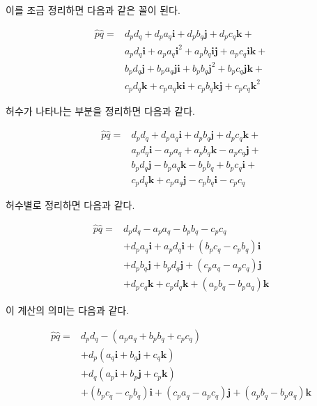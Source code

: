 이를 조금 정리하면 다음과 같은 꼴이 된다.

\begin{eqnarray}
\hat{p}\hat{q} = &
d_p d_q + d_p a_q{\mathbf i} + d_p b_q{\mathbf j} + d_p c_q{\mathbf k} + \\ \nonumber
& a_p d_q{\mathbf i}  + a_p a_q {\mathbf i}^2 + a_p b_q{\mathbf i} {\mathbf j} + a_p c_q {\mathbf i}  {\mathbf k} + \\ \nonumber
& b_p d_q {\mathbf j} + b_p a_q {\mathbf j} {\mathbf i} + b_p b_q{\mathbf j}^2 + b_p c_q {\mathbf j} {\mathbf k} + \\ \nonumber
& c_p d_q{\mathbf k}  + c_p a_q{\mathbf k} {\mathbf i} + c_p b_q{\mathbf k} {\mathbf j} + c_p c_q {\mathbf k}^2
\end{eqnarray}

허수가 나타나는 부분을 정리하면 다음과 같다.

\begin{eqnarray}
\hat{p}\hat{q} = &
d_p d_q + d_p a_q{\mathbf i} + d_p b_q{\mathbf j} + d_p c_q{\mathbf k} + \\ \nonumber
& a_p d_q{\mathbf i}  - a_p a_q + a_p b_q{\mathbf k} - a_p c_q {\mathbf j} + \\ \nonumber
& b_p d_q {\mathbf j} - b_p a_q {\mathbf k} - b_p b_q + b_p c_q {\mathbf i} + \\ \nonumber
& c_p d_q {\mathbf k}  + c_p a_q{\mathbf j} - c_p b_q{\mathbf i} - c_p c_q 
\end{eqnarray}

허수별로 정리하면 다음과 같다.

\begin{eqnarray}
\hat{p}\hat{q} = & d_p d_q  - a_p a_q - b_p b_q - c_p c_q  \\ \nonumber
&+ d_p a_q{\mathbf i} + a_p d_q{\mathbf i} + (b_p c_q - c_p b_q ) {\mathbf i}  \\ \nonumber
&+ d_p b_q{\mathbf j} + b_p d_q {\mathbf j} + (c_p a_q - a_p c_q) {\mathbf j} \\ \nonumber
&+ d_p c_q{\mathbf k} + c_p d_q {\mathbf k} + (a_p b_q - b_p a_q) {\mathbf k}
\end{eqnarray}


이 계산의 의미는 다음과 같다.

\begin{eqnarray}
\hat{p}\hat{q} = & d_p d_q  - (a_p a_q + b_p b_q + c_p c_q)  \\ \nonumber
&+ d_p ( a_q{\mathbf i} + b_q {\mathbf j} + c_q {\mathbf k}) \\ \nonumber
&+ d_q ( a_p{\mathbf i} + b_p {\mathbf j} + c_p {\mathbf k}) \\ \nonumber
&+ (b_p c_q - c_p b_q ) {\mathbf i}  + (c_p a_q - a_p c_q) {\mathbf j} + (a_p b_q - b_p a_q) {\mathbf k}
\end{eqnarray}

